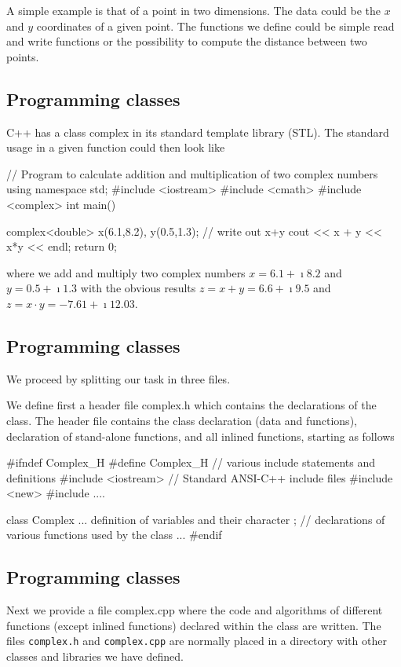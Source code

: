 \documentclass[%
oneside,                 %
final,                   %
10pt]{article}
\begin{document}
{{{{{{{{{{{{{A simple example is that of a point in two dimensions.
The data could be the $x$ and $y$ coordinates of a given  point. The functions
we define could be simple read and write functions or the possibility to compute the distance between two points.

\subsection{Programming classes}

C++ has a class complex in its standard
template library (STL). The standard usage in a given function could then look like

\bcppcod
// Program to calculate addition and multiplication of two complex numbers
using namespace std;
#include <iostream>
#include <cmath>
#include <complex>
int main()
{
  complex<double> x(6.1,8.2), y(0.5,1.3);
  // write out x+y
  cout << x + y << x*y  << endl;
  return 0;

\ecppcod
where we add and multiply two complex numbers $x=6.1+\imath 8.2$ and $y=0.5+\imath 1.3$ with the obvious results
$z=x+y=6.6+\imath 9.5$ and $z=x\cdot y= -7.61+\imath 12.03$.

\subsection{Programming classes}

We proceed by  splitting our task in three files.

We define first a header file complex.h  which contains the declarations of
the class. The header file contains the class declaration (data and
functions), declaration of stand-alone functions, and all inlined
functions, starting as follows

\bcppcod
#ifndef Complex_H
#define Complex_H
//   various include statements and definitions
#include <iostream>          // Standard ANSI-C++ include files
#include <new>
#include ....

class Complex
{...
definition of variables and their character
};
//   declarations of various functions used by the class
...
#endif
\ecppcod

\subsection{Programming classes}

Next we provide a file complex.cpp where the code and algorithms of
different functions (except inlined functions) declared within the
class are written.  The files \Verb!complex.h! and \Verb!complex.cpp! are normally
placed in a directory with other classes and libraries we have
defined.

}}}}}}}}}}}}}}
\end{document}
